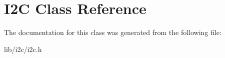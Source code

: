 \hypertarget{class_i2_c}{}\section{I2C Class Reference}
\label{class_i2_c}


The documentation for this class was generated from the following file\+:\begin{DoxyCompactItemize}
\item 
lib/i2c/i2c.\+h\end{DoxyCompactItemize}
